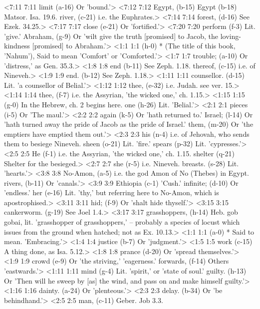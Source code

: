 <7:11 7:11  limit (a-16)  Or 'bound.'>
<7:12 7:12  Egypt, (b-15)  Egypt (b-18)
  Matsor. Isa. 19.6.
  river, (c-21)  i.e. the Euphrates.>
<7:14 7:14  forest, (d-16)  See Ezek. 34.25.>
<7:17 7:17  close (e-21)  Or 'fortified.'>
<7:20 7:20  perform (f-3)  Lit. 'give.'
  Abraham, (g-9)  Or 'wilt give the truth [promised] to Jacob, the  loving-kindness [promised] to Abraham.'>
<1:1 1:1   (h-0)  * (The title of this book, 'Nahum'), Said to mean 'Comfort'  or 'Comforted.'>
<1:7 1:7  trouble; (a-10)  Or 'distress,' as Gen. 35.3.>
<1:8 1:8  end (b-11) See Zeph. 1.18.
  thereof, (c-15)  i.e. of Nineveh.>
<1:9 1:9  end. (b-12)  See Zeph. 1.18.>
<1:11 1:11  counsellor. (d-15)  Lit. 'a counsellor of Belial.'>
<1:12 1:12  thee, (e-32)  i.e. Judah. see ver. 15.>
<1:14 1:14  thee, (f-7) i.e. the Assyrian, 'the wicked one,' ch. 1.15.>
<1:15 1:15   (g-0)  In the Hebrew, ch. 2 begins here.
  one (h-26)  Lit. 'Belial.'>
<2:1 2:1  pieces (i-5)  Or 'The maul.'>
<2:2 2:2  again (k-5)  Or 'hath returned to.'
  Israel; (l-14)  Or 'hath turned away the pride of Jacob as the pride of  Israel.'
  them, (m-20)  Or 'the emptiers have emptied them out.'>
<2:3 2:3  his (n-4)  i.e. of Jehovah, who sends them to besiege Nineveh.
  sheen (o-21)  Lit. 'fire.'
  spears (p-32)  Lit. 'cypresses.'>
<2:5 2:5  He (f-1)  i.e. the Assyrian, 'the wicked one,' ch. 1.15.
  shelter (q-21)  Shelter for the besieged.>
<2:7 2:7  she (r-5)  i.e. Nineveh.
  breasts. (s-28)  Lit. 'hearts.'>
<3:8 3:8  No-Amon, (a-5)  i.e. the god Amon of No (Thebes) in Egypt.
  rivers, (b-11)  Or 'canals.'>
<3:9 3:9  Ethiopia (c-1)  'Cush.'
  infinite; (d-10)  Or 'endless.'
  her (e-16)  Lit. 'thy,' but referring here to No-Amon, which is  apostrophised.>
<3:11 3:11  hid; (f-9)  Or 'shalt hide thyself.'>
<3:15 3:15  cankerworm. (g-19)  See Joel 1.4.>
<3:17 3:17  grasshoppers, (h-14)  Heb. gob gobai, lit. 'grasshopper of grasshoppers,' --  probably a species of locust which issues from the ground when  hatched; not as Ex. 10.13.>
<1:1 1:1   (a-0)  * Said to mean. 'Embracing.'>
<1:4 1:4  justice (b-7)  Or 'judgment.'>
<1:5 1:5  work (c-15)  A thing done, as Isa. 5.12.>
<1:8 1:8  prance (d-20)  Or 'spread themselves.'>
<1:9 1:9  crowd (e-9)  Or 'the striving,' 'eagerness.'
  forwards, (f-14)  Others 'eastwards.'>
<1:11 1:11  mind (g-4)  Lit. 'spirit,' or 'state of soul.'
  guilty. (h-13)  Or 'Then will he sweep by [as] the wind, and pass on and make  himself guilty.'>
<1:16 1:16  dainty. (a-24)  Or 'plenteous.'>
<2:3 2:3  delay. (b-34)  Or 'be behindhand.'>
<2:5 2:5  man, (c-11)  Geber. Job 3.3.
